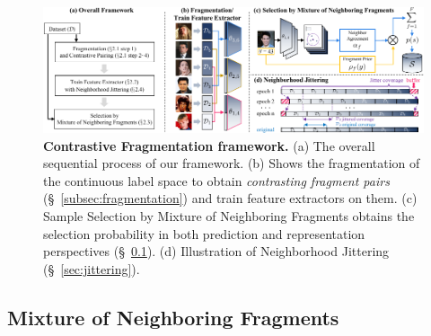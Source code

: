\documentclass{article}
\theoremstyle{plain}
\theoremstyle{definition}
\theoremstyle{remark}
\begin{document}
\begin{figure}[t]
\begin{center}
\includegraphics[width=\textwidth]{imgs/main_framework_simplified.pdf}
\caption{\textbf{Contrastive Fragmentation framework.}
(a) The overall sequential process of our framework.
(b) Shows the fragmentation of the continuous label space to obtain \textit{contrasting fragment pairs} (\S~\ref{subsec:fragmentation}) and train feature extractors on them.
(c) Sample Selection by Mixture of Neighboring Fragments obtains the selection probability in both prediction and representation perspectives (\S~\ref{subsec:mixture_of_contrasing_fragments}).
(d) Illustration of Neighborhood Jittering (\S~\ref{sec:jittering}).
}
\label{fig:framework}
\end{center}
\vskip -0.2in
\end{figure}




\subsection{Mixture of Neighboring Fragments}
\label{subsec:mixture_of_contrasing_fragments}
\end{document}
